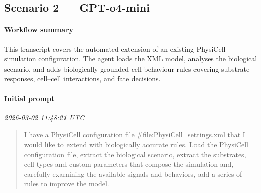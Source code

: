 \subsection{Scenario 2 — GPT-o4-mini}

\paragraph{Workflow summary}
This transcript covers the automated extension of an existing PhysiCell simulation configuration. The agent loads the XML model, analyses the biological scenario, and adds biologically grounded cell-behaviour rules covering substrate responses, cell–cell interactions, and fate decisions.

\paragraph{Initial prompt} \hfill \textit{\small 2026-03-02 11:48:21 UTC}
\begin{quote}
I have a PhysiCell configuration file \#file:PhysiCell\_settings.xml  that I would like to extend with biologically accurate rules. Load the PhysiCell configuration file, extract the biological scenario, extract the substrates, cell types and custom parameters that compose the simulation and, carefully examining the available signals and behaviors, add a series of rules to improve the model.
\end{quote}

